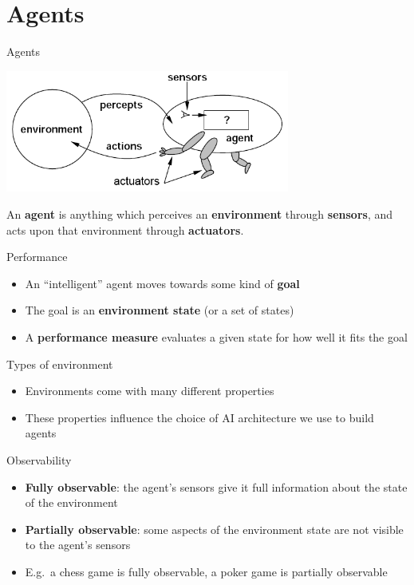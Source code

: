 \part{Agents}
\frame{\partpage}

\begin{frame}{Agents}
    \begin{center}
        \includegraphics[width=0.7\textwidth]{agent}

        \vspace{2ex}

        \pause An \textbf{agent} is anything which perceives an \textbf{environment} through \textbf{sensors},
            and acts upon that environment through \textbf{actuators}.
    \end{center}
\end{frame}

\begin{frame}{Performance}
    \begin{itemize}
        \pause\item An ``intelligent'' agent moves towards some kind of \textbf{goal}
        \pause\item The goal is an \textbf{environment state} (or a set of states)
        \pause\item A \textbf{performance measure} evaluates a given state for how well it fits the goal
    \end{itemize}
\end{frame}

\begin{frame}{Types of environment}
    \begin{itemize}
        \pause\item Environments come with many different properties
        \pause\item These properties influence the choice of AI architecture we use to build agents
    \end{itemize}
\end{frame}

\begin{frame}{Observability}
    \begin{itemize}
        \pause\item \textbf{Fully observable}: the agent's sensors give it full information about the state of the environment
        \pause\item \textbf{Partially observable}: some aspects of the environment state are not visible to the agent's sensors
        \pause\item E.g.\ a chess game is fully observable, a poker game is partially observable
    \end{itemize}
\end{frame}

